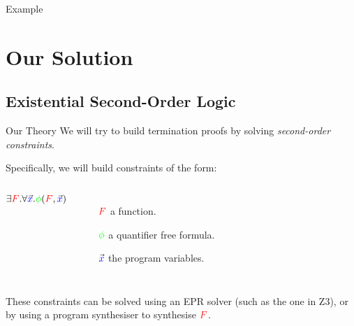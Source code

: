 \documentclass[xcolor=pdftex,t,11pt]{beamer}
\begin{document}
\begin{frame}{Example}
\end{frame}

\section{Our Solution}

\subsection{Existential Second-Order Logic}

\begin{frame}[fragile]{Our Theory}
 We will try to build termination proofs by solving \emph{second-order constraints}.

 \vspace{1em}

 Specifically, we will build constraints of the form:

 \begin{center}
 \begin{columns}
  $\exists {\textcolor{red} F} . \forall \vec{\textcolor{blue} x} . {\textcolor{green} \phi}({\textcolor{red} F}, \vec{\textcolor{blue} x})$

  \begin{minipage}{\textwidth}
 \begin{itemize}
  \item[$\textcolor{red} F$] a function.
  \item[$\textcolor{green} \phi$] a quantifier free formula.
  \item[$\vec{\textcolor{blue} x}$] the program variables.
 \end{itemize}
 \end{minipage}
 \end{columns}

 \end{center}

 \vspace{.75em}

 These constraints can be solved using an EPR solver (such as the one in Z3), or by using a program
 synthesiser to synthesise $\textcolor{red} F$.
\end{frame}
\end{document}
